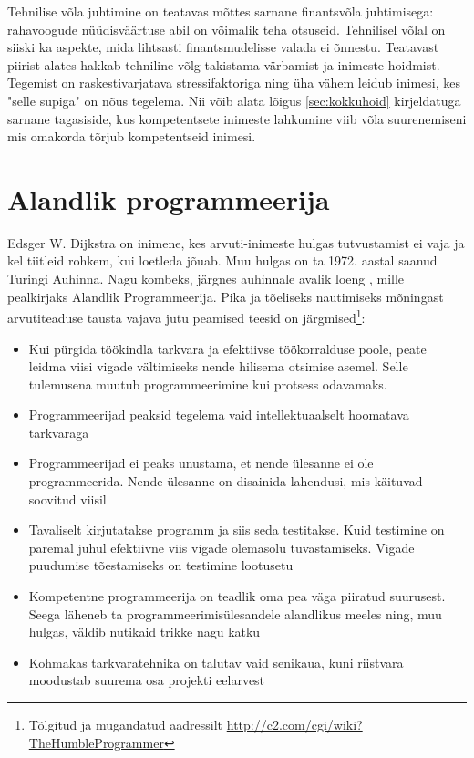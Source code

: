 \documentclass{tufte-book}
\begin{document}
Tehnilise võla juhtimine on teatavas mõttes sarnane finantsvõla juhtimisega: rahavoogude nüüdisväärtuse abil on võimalik teha otsuseid. Tehnilisel võlal on siiski ka aspekte, mida lihtsasti finantsmudelisse valada ei õnnestu. Teatavast piirist alates hakkab tehniline võlg takistama värbamist ja inimeste hoidmist. Tegemist on raskestivarjatava stressifaktoriga ning üha vähem leidub inimesi, kes "selle supiga" on nõus tegelema. Nii võib alata lõigus \ref{sec:kokkuhoid} kirjeldatuga sarnane tagasiside, kus kompetentsete inimeste lahkumine viib võla suurenemiseni mis omakorda tõrjub kompetentseid inimesi. 

\section{Alandlik programmeerija}
\label{humble}
Edsger W. Dijkstra on inimene, kes arvuti-inimeste hulgas tutvustamist ei vaja ja kel tiitleid rohkem, kui loetleda jõuab. Muu hulgas on ta 1972. aastal saanud Turingi Auhinna. Nagu kombeks, järgnes auhinnale avalik loeng \citep{yourdon1979classics}, mille pealkirjaks Alandlik Programmeerija. Pika ja tõeliseks nautimiseks mõningast arvutiteaduse tausta vajava jutu peamised teesid on järgmised\footnote{Tõlgitud ja mugandatud aadressilt \url{http://c2.com/cgi/wiki?TheHumbleProgrammer}}:
\begin{itemize}
	\item Kui pürgida töökindla tarkvara ja efektiivse töökorralduse poole, peate leidma viisi vigade vältimiseks nende hilisema otsimise asemel. Selle tulemusena muutub programmeerimine kui protsess odavamaks.
	\item Programmeerijad peaksid tegelema vaid intellektuaalselt hoomatava tarkvaraga
	\item Programmeerijad ei peaks unustama, et nende ülesanne ei ole programmeerida. Nende ülesanne on disainida lahendusi, mis käituvad soovitud viisil
	\item Tavaliselt kirjutatakse programm ja siis seda testitakse. Kuid testimine on paremal juhul efektiivne viis vigade olemasolu tuvastamiseks. Vigade puudumise  tõestamiseks on testimine lootusetu
	\item Kompetentne programmeerija on teadlik oma pea väga piiratud suurusest. Seega läheneb ta programmeerimisülesandele alandlikus meeles ning, muu hulgas, väldib nutikaid trikke nagu katku
	\item Kohmakas tarkvaratehnika on talutav vaid senikaua, kuni riistvara moodustab suurema osa projekti eelarvest
\end{itemize}
\end{document}

